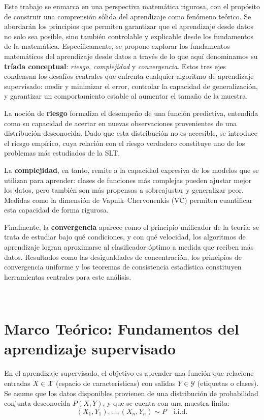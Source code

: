 \documentclass[12pt]{article}
\begin{document}
Este trabajo se enmarca en una perspectiva matemática rigurosa, con el propósito de construir una comprensión sólida del aprendizaje como fenómeno teórico. Se abordarán los principios que permiten garantizar que el aprendizaje desde datos no solo sea posible, sino también controlable y explicable desde los fundamentos de la matemática. Específicamente, se propone explorar los fundamentos matemáticos del aprendizaje desde datos a través de lo que aquí denominamos su \textbf{tríada conceptual}: \textit{riesgo}, \textit{complejidad} y \textit{convergencia}. Estos tres ejes condensan los desafíos centrales que enfrenta cualquier algoritmo de aprendizaje supervisado: medir y minimizar el error, controlar la capacidad de generalización, y garantizar un comportamiento estable al aumentar el tamaño de la muestra.

La noción de \textbf{riesgo} formaliza el desempeño de una función predictiva, entendida como su capacidad de acertar en nuevas observaciones provenientes de una distribución desconocida. Dado que esta distribución no es accesible, se introduce el riesgo empírico, cuya relación con el riesgo verdadero constituye uno de los problemas más estudiados de la SLT.

La \textbf{complejidad}, en tanto, remite a la capacidad expresiva de los modelos que se utilizan para aprender: clases de funciones más complejas pueden ajustar mejor los datos, pero también son más propensas a sobreajustar y generalizar peor. Medidas como la dimensión de Vapnik–Chervonenkis (VC) permiten cuantificar esta capacidad de forma rigurosa.

Finalmente, la \textbf{convergencia} aparece como el principio unificador de la teoría: se trata de estudiar bajo qué condiciones, y con qué velocidad, los algoritmos de aprendizaje logran aproximarse al clasificador óptimo a medida que reciben más datos. Resultados como las desigualdades de concentración, los principios de convergencia uniforme y los teoremas de consistencia estadística constituyen herramientas centrales para este análisis.

\


\section{ Marco Teórico: Fundamentos del aprendizaje supervisado}

En el aprendizaje supervisado, el objetivo es aprender una función que relacione entradas $X \in \mathcal{X}$ (espacio de características) con salidas $Y \in \mathcal{Y}$ (etiquetas o clases). Se asume que los datos disponibles provienen de una distribución de probabilidad conjunta desconocida $P(X, Y)$, y que se cuenta con una muestra finita:
\[
(X_1, Y_1), \dots, (X_n, Y_n) \sim P \quad \text{i.i.d.}
\]
\end{document}
